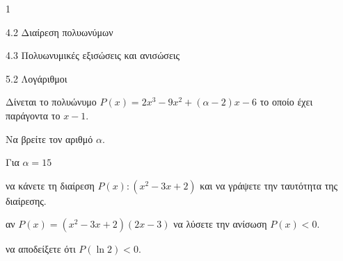 \begin{ylh}{1}
\item 4.2 Διαίρεση πολυωνύμων
\item 4.3 Πολυωνυμικές εξισώσεις και ανισώσεις
\item 5.2 Λογάριθμοι
\end{ylh}
Δίνεται το πολυώνυμο $P(x) = 2x^3 - 9x^2 + (\alpha - 2)x - 6$ το οποίο έχει παράγοντα το $x - 1$.
\begin{alist}
\item Να βρείτε τον αριθμό $\alpha$.
\item Για $\alpha = 15$
\begin{rlist}
\item να κάνετε τη διαίρεση $P(x) : (x^2 - 3x + 2)$ και να γράψετε την ταυτότητα της διαίρεσης.
\item αν $P(x) = (x^2 - 3x + 2)(2x - 3)$ να λύσετε την ανίσωση $P(x) < 0$.
\item να αποδείξετε ότι $P(\ln 2) < 0$.
\end{rlist}
\end{alist}

